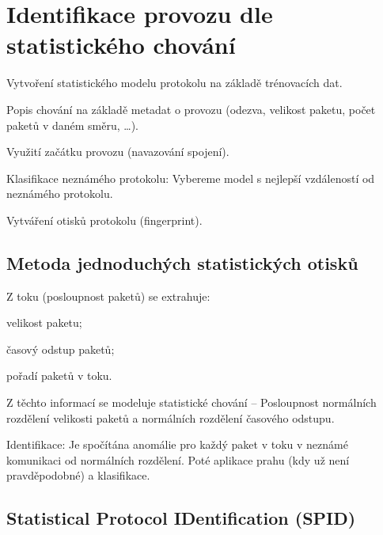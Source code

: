 
\section{Identifikace provozu dle statistického chování}

\begin{compactitem}
    \item Vytvoření statistického modelu protokolu na základě trénovacích dat. \begin{compactitem}
        \item Popis chování na základě metadat o provozu (odezva, velikost paketu, počet paketů v daném směru, \dots).
        \item Využití začátku provozu (navazování spojení).
    \end{compactitem}
    \item Klasifikace neznámého protokolu: Vybereme model s nejlepší vzdáleností od neznámého protokolu.
    \item Vytváření otisků protokolu (fingerprint).
\end{compactitem}

\subsection*{Metoda jednoduchých statistických otisků}

\begin{compactitem}
    \item Z toku (posloupnost paketů) se extrahuje: \begin{compactitem}
        \item velikost paketu;
        \item časový odstup paketů;
        \item pořadí paketů v toku.
    \end{compactitem}
    \item Z těchto informací se modeluje statistické chování -- Posloupnost normálních rozdělení velikosti paketů a normálních rozdělení časového odstupu.
    \item Identifikace: Je spočítána anomálie pro každý paket v toku v neznámé komunikaci od normálních rozdělení. Poté aplikace prahu (kdy už není pravděpodobné) a klasifikace.
\end{compactitem}

\subsection*{Statistical Protocol IDentification (SPID)}

